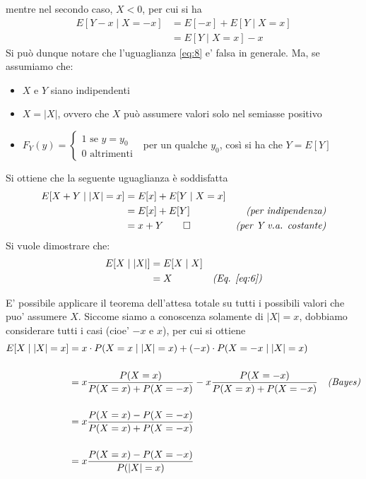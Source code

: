 \documentclass{homework}
\begin{document}
mentre nel secondo caso, $X < 0$, per cui si ha
\[
\begin{align}
E[Y - x \mid X = -x] &= E[-x] + E[Y \mid X = x] \\
                 &= E[Y \mid X = x] - x
\end{align}
\]
Si può dunque notare che l'uguaglianza \ref{eq:8} e' falsa in generale.
Ma, se assumiamo che:
\begin{itemize}
\item $X$ e $Y$ siano indipendenti 
\item $X = |X|$, ovvero che $X$ può assumere valori solo nel semiasse positivo
\item $F_Y(y) = \begin{cases}  1 \text{ se } y = y_0 \\ 0 \text{ altrimenti }\end{cases}$ per un qualche $y_0$, così si ha che $Y = E[Y]$
\end{itemize}
Si ottiene che la seguente uguaglianza è soddisfatta \[
\begin{align}
E[X + Y \mid |X| = x] &= E[x] + E[Y \mid X = x] \\
                 &= E[x] + E[Y] & \emph{(per indipendenza)}\\
                 &= x + Y \qed & \emph{(per Y v.a. costante)}\\
\end{align}
\]
\exercise*[3.c]
Si vuole dimostrare che:
\[
\begin{align}
E[X\mid |X|] &= E[X \mid X] \\
             &= X & \emph{(Eq. \ref{eq:6})}
\end{align}
\]

E' possibile applicare il teorema dell'attesa totale su tutti i possibili valori che puo' assumere $X$. Siccome siamo a conoscenza solamente di $|X| = x$, dobbiamo
considerare tutti i casi (cioe' $-x$ e $x$), per cui si ottiene
\[
\begin{align}
    E[X \mid |X| = x] &= x \cdot P(X = x \mid |X| = x) + (-x) \cdot P(X = -x \mid |X| = x) &\\[3ex]
                  &= x \frac{P(X = x)}{P(X = x) + P(X = -x)} - x \frac{P(X = -x)}{P(X = x) + P(X = -x)}  &\emph{(Bayes)}\\[3ex]
                  & = x \frac{P(X = x) - P(X = -x)}{P(X = x) + P(X = -x)} &\\[3ex]
                  &= x \frac{P(X = x) - P(X = -x)}{P(|X| = x)}&
\end{align}
\]
\end{document}
